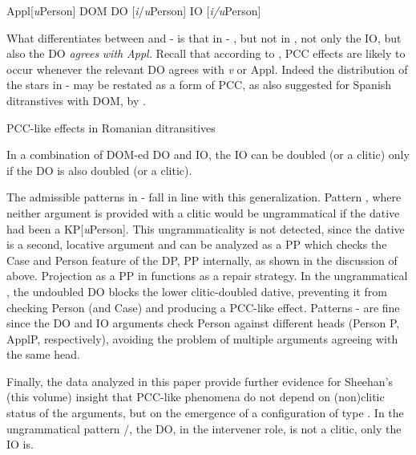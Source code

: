 \documentclass[output=paper,modfonts,nonflat,newtxmath]{langsci/langscibook}
\begin{document}
\ea%
   \label{ex:cornilescu:36}
   Appl[\textit{u}Person] \hspace{0.8cm} DOM DO [\textit{i}/\textit{u}Person] \hspace{0.8cm} IO [\textit{i/u}Person]
   \z

        

What differentiates between  and - is that in - , but not in , not only the IO, but also the DO \textit{agrees} \textit{with} \textit{Appl.} Recall that according to \citet{Preminger2016}, PCC effects are likely to occur whenever the relevant DO agrees with \textit{v} or Appl. Indeed the distribution of the stars in -  may be restated as a form of PCC, as also suggested for Spanish ditranstives with DOM, by \citet{OrmazabalRomero2013Borealis}.

\ea%
   \label{ex:cornilescu:37}
   PCC-like effects in Romanian ditransitives
   \z

 

In a combination of DOM-ed DO and IO, the IO can be doubled (or a clitic) only if the DO is also doubled (or a clitic). 

The admissible patterns in - fall in line with this generalization. Pattern , where neither argument is provided with a clitic would be ungrammatical if the dative had been a KP[\textit{u}Person]. This ungrammaticality is not detected, since the dative is a second, locative argument and can be analyzed as a PP which checks the Case and Person feature of the DP, PP internally, as shown in the discussion of  above. Projection as a PP in  functions as a repair strategy. In the ungrammatical , the undoubled DO blocks the lower clitic-doubled dative, preventing it from checking Person (and Case) and producing a PCC-like effect. Patterns - are fine since the DO and IO arguments check Person against different heads (Person P, ApplP, respectively), avoiding the problem of multiple arguments agreeing with the same head.

Finally, the data analyzed in this paper provide further evidence for Sheehan’s (this volume) insight that PCC-like phenomena do not depend on (non)clitic status of the arguments, but on the emergence of a configuration of type . In the ungrammatical pattern /, the DO, in the intervener role, is not a clitic, only the IO is.
\end{document}
